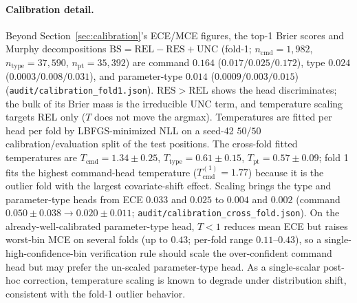 \documentclass[sensors,article,submit,moreauthors,pdftex]{Definitions/mdpi}
\begin{document}
\paragraph{Calibration detail.} Beyond Section~\ref{sec:calibration}'s ECE/MCE figures, the top-1 Brier scores and Murphy decompositions $\mathrm{BS}\!=\!\mathrm{REL}\!-\!\mathrm{RES}\!+\!\mathrm{UNC}$ (fold-1; $n_{\text{cmd}} = 1{,}982$, $n_{\text{type}} = 37{,}590$, $n_{\text{pt}} = 35{,}392$) are command $0.164$ ($0.017/0.025/0.172$), type $0.024$ ($0.0003/0.008/0.031$), and parameter-type $0.014$ ($0.0009/0.003/0.015$) (\texttt{audit/calibration\_fold1.json}). $\mathrm{RES}\!>\!\mathrm{REL}$ shows the head discriminates; the bulk of its Brier mass is the irreducible UNC term, and temperature scaling targets REL only ($T$ does not move the argmax). Temperatures are fitted per head per fold by LBFGS-minimized NLL on a seed-42 $50/50$ calibration/evaluation split of the test positions. The cross-fold fitted temperatures are $T_{\text{cmd}} = 1.34 \pm 0.25$, $T_{\text{type}} = 0.61 \pm 0.15$, $T_{\text{pt}} = 0.57 \pm 0.09$; fold 1 fits the highest command-head temperature ($T_{\text{cmd}}^{(1)} = 1.77$) because it is the outlier fold with the largest covariate-shift effect. Scaling brings the type and parameter-type heads from ECE $0.033$ and $0.025$ to $0.004$ and $0.002$ (command $0.050 \pm 0.038 \to 0.020 \pm 0.011$; \texttt{audit/calibration\_cross\_fold.json}). On the already-well-calibrated parameter-type head, $T\!<\!1$ reduces mean ECE but raises worst-bin MCE on several folds (up to $0.43$; per-fold range $0.11$--$0.43$), so a single-high-confidence-bin verification rule should scale the over-confident command head but may prefer the un-scaled parameter-type head. As a single-scalar post-hoc correction, temperature scaling is known to degrade under distribution shift, consistent with the fold-1 outlier behavior.
\end{document}
